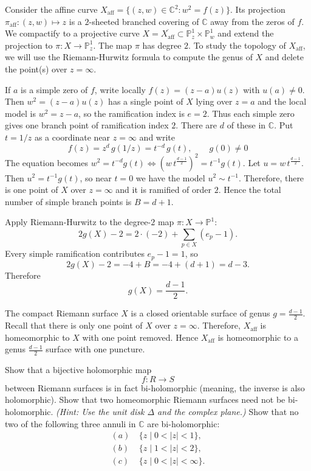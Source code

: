 \documentclass[12pt]{article}  %
\begin{document}
\begin{solution}
    Consider the affine curve $X_{\mathrm{aff}} = \{(z,w)\in\mathbb{C}^2 : w^2 = f(z)\}$. Its projection $\pi_{\mathrm{aff}} : (z,w) \mapsto z$ is a $2$-sheeted branched covering of $\mathbb{C}$ away from the zeros of $f$. We compactify to a projective curve $X = \overline{X_{\mathrm{aff}}} \subset \mathbb{P}^1_z \times \mathbb{P}^1_w$ and extend the projection to $\pi : X \longrightarrow \mathbb{P}^1_z$. The map $\pi$ has degree $2$.
To study the topology of $X_{\mathrm{aff}}$, we will use the Riemann-Hurwitz formula to compute the genus of $X$ and delete the point(s) over $z=\infty$.



    If $a$ is a simple zero of $f$, write locally $f(z) = (z-a)u(z)$ with $u(a)\neq 0$. Then $w^2 = (z-a)u(z)$ has a single point of $X$ lying over $z=a$ and the local model is $w^2 = z-a$, so the ramification index is $e=2$. Thus each simple zero gives one branch point of ramification index $2$. There are $d$ of these in $\mathbb{C}$. Put $t=1/z$ as a coordinate near $z=\infty$ and write
    \[f(z) = z^{d}\,g(1/z) = t^{-d}\,g(t), \qquad g(0)\neq 0\]
    The equation becomes
    $w^2 = t^{-d}g(t) \Longleftrightarrow (w\,t^{\frac{d-1}{2}})^2 = t^{-1}g(t)$.
    Let $u = w\,t^{\frac{d-1}{2}}$. Then $u^2 = t^{-1}g(t)$, so near $t=0$ we have the model $u^2 \sim t^{-1}$. Therefore, there is one point of $X$ over $z=\infty$ and it is ramified of order $2$. Hence the total number of simple branch points is $B = d+1$.

    Apply Riemann-Hurwitz to the degree-$2$ map $\pi : X \to \mathbb{P}^1$:
    \[
    2g(X)-2 = 2\cdot(-2) + \sum_{p\in X}(e_p-1).
    \]
    Every simple ramification contributes $e_p-1=1$, so
    \[
    2g(X)-2 = -4 + B = -4 + (d+1) = d-3.
    \]
    Therefore
    \[
    g(X) = \frac{d-1}{2}.
    \]

    The compact Riemann surface $X$ is a closed orientable surface of genus $g = \frac{d-1}{2}$. Recall that there is only one point of $X$ over $z=\infty$. Therefore, $X_{\mathrm{aff}}$ is homeomorphic to $X$ with one point removed. Hence $X_{\mathrm{aff}}$ is homeomorphic to a genus $\frac{d-1}{2}$ surface with one puncture.

\end{solution}

\begin{problem}{3}
Show that a bijective holomorphic map 
\[
f : R \to S
\] 
between Riemann surfaces is in fact bi-holomorphic (meaning, the inverse is also holomorphic). Show that two homeomorphic Riemann surfaces need not be bi-holomorphic. \emph{(Hint: Use the unit disk $\Delta$ and the complex plane.)} Show that no two of the following three annuli in $\mathbb{C}$ are bi-holomorphic:
\begin{align*}
(a)\ & \{z \mid 0 < |z| < 1\}, \\
(b)\ & \{z \mid 1 < |z| < 2\}, \\
(c)\ & \{z \mid 0 < |z| < \infty\}.
\end{align*}
\end{problem}
\end{document}

